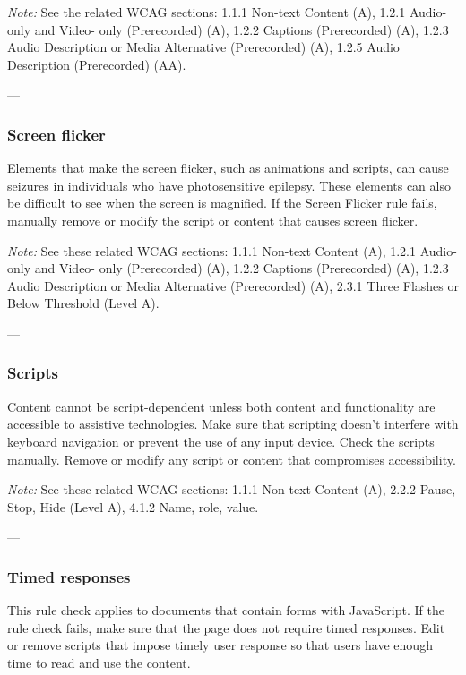 \vspace{0.5em}
\noindent\textit{Note:} See the related WCAG sections: 1.1.1 Non-text Content (A), 1.2.1 Audio- only and Video- only (Prerecorded) (A), 1.2.2 Captions (Prerecorded) (A), 1.2.3 Audio Description or Media Alternative (Prerecorded) (A), 1.2.5 Audio Description (Prerecorded) (AA)\cite{WCAG}.

---

\subsubsection{Screen flicker}
Elements that make the screen flicker, such as animations and scripts, can cause seizures in individuals who have photosensitive epilepsy. These elements can also be difficult to see when the screen is magnified\cite{AdobeHelpX}.
If the Screen Flicker rule fails, manually remove or modify the script or content that causes screen flicker.

\vspace{0.5em}
\noindent\textit{Note:} See these related WCAG sections: 1.1.1 Non-text Content (A), 1.2.1 Audio- only and Video- only (Prerecorded) (A), 1.2.2 Captions (Prerecorded) (A), 1.2.3 Audio Description or Media Alternative (Prerecorded) (A), 2.3.1 Three Flashes or Below Threshold (Level A)\cite{WCAG}.

---

\subsubsection{Scripts}
Content cannot be script-dependent unless both content and functionality are accessible to assistive technologies. Make sure that scripting doesn't interfere with keyboard navigation or prevent the use of any input device\cite{AdobeHelpX}.
Check the scripts manually. Remove or modify any script or content that compromises accessibility.

\vspace{0.5em}
\noindent\textit{Note:} See these related WCAG sections: 1.1.1 Non-text Content (A), 2.2.2 Pause, Stop, Hide (Level A), 4.1.2 Name, role, value\cite{WCAG}.

---

\subsubsection{Timed responses}
This rule check applies to documents that contain forms with JavaScript. If the rule check fails, make sure that the page does not require timed responses. Edit or remove scripts that impose timely user response so that users have enough time to read and use the content\cite{AdobeHelpX}.

